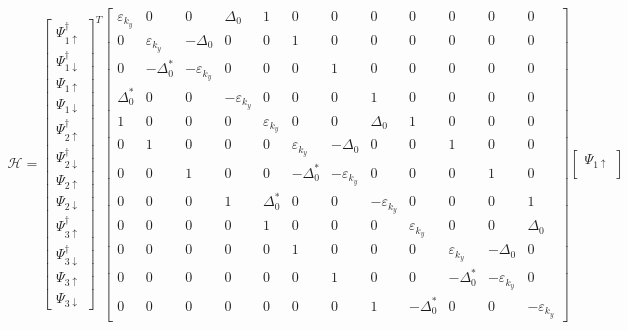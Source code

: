 \documentclass{jsarticle}
\begin{document}
		\begin{align}
			\mathcal{H}=
			\begin{bmatrix}
				\Psi_{1\uparrow}^\dagger \\
				\Psi_{1\downarrow}^\dagger \\
				\Psi_{1\uparrow} \\
				\Psi_{1\downarrow} \\
				\Psi_{2\uparrow}^\dagger \\
				\Psi_{2\downarrow}^\dagger \\
				\Psi_{2\uparrow} \\
				\Psi_{2\downarrow} \\
				\Psi_{3\uparrow}^\dagger \\
				\Psi_{3\downarrow}^\dagger \\
				\Psi_{3\uparrow} \\
				\Psi_{3\downarrow}
			\end{bmatrix}
			^T
			\begin{bmatrix}
				\varepsilon_{k_y} & 0 & 0 & \Delta_0 & 1 & 0 & 0 & 0 & 0 & 0 & 0 & 0 \\
				0 & \varepsilon_{k_y} & -\Delta_0 & 0 & 0 & 1 & 0 & 0 & 0 & 0 & 0 & 0 \\
				0 & -\Delta_0^\ast & -\varepsilon_{k_y} & 0 & 0 & 0 & 1 & 0 & 0 & 0 & 0 & 0 \\
				\Delta_0^\ast & 0 & 0 & -\varepsilon_{k_y} & 0 & 0 & 0 & 1 & 0 & 0 & 0 & 0 \\
				1 & 0 & 0 & 0 & \varepsilon_{k_y} & 0 & 0 & \Delta_0 & 1 & 0 & 0 & 0 \\
				0 & 1 & 0 & 0 & 0 & \varepsilon_{k_y} & -\Delta_0 & 0 & 0 & 1 & 0 & 0 \\
				0 & 0 & 1 & 0 & 0 & -\Delta_0^\ast & -\varepsilon_{k_y} & 0 & 0 & 0 & 1 & 0 \\
				0 & 0 & 0 & 1 & \Delta_0^\ast & 0 & 0 & -\varepsilon_{k_y} & 0 & 0 & 0 & 1 \\
				0 & 0 & 0 & 0 & 1 & 0 & 0 & 0 & \varepsilon_{k_y} & 0 & 0 & \Delta_0 \\
				0 & 0 & 0 & 0 & 0 & 1 & 0 & 0 & 0 & \varepsilon_{k_y} & -\Delta_0 & 0 \\
				0 & 0 & 0 & 0 & 0 & 0 & 1 & 0 & 0 & -\Delta_0^\ast & -\varepsilon_{k_y} & 0 \\
				0 & 0 & 0 & 0 & 0 & 0 & 0 & 1 & -\Delta_0^\ast & 0 & 0 & -\varepsilon_{k_y}
			\end{bmatrix}
			\begin{bmatrix}
				\Psi_{1\uparrow} \\

\end{bmatrix}
\end{align}
\end{document}
